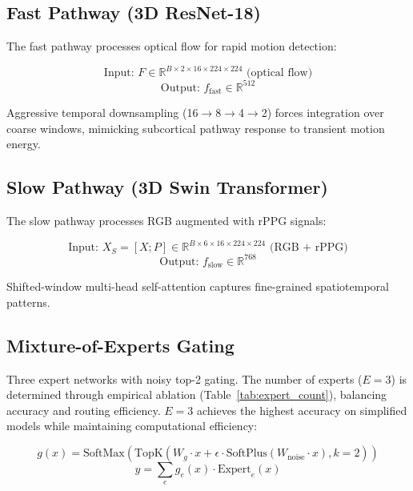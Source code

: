 \documentclass[preprint,12pt,authoryear]{elsarticle}
\begin{document}
\subsection{Fast Pathway (3D ResNet-18)}

The fast pathway processes optical flow for rapid motion detection:

\begin{equation}
\text{Input: } F \in \mathbb{R}^{B \times 2 \times 16 \times 224 \times 224} \text{ (optical flow)}
\end{equation}
\begin{equation}
\text{Output: } f_{\text{fast}} \in \mathbb{R}^{512}
\end{equation}

Aggressive temporal downsampling (16$\rightarrow$8$\rightarrow$4$\rightarrow$2) forces integration over coarse windows, mimicking subcortical pathway response to transient motion energy.

\subsection{Slow Pathway (3D Swin Transformer)}

The slow pathway processes RGB augmented with rPPG signals:

\begin{equation}
\text{Input: } X_S = [X; P] \in \mathbb{R}^{B \times 6 \times 16 \times 224 \times 224} \text{ (RGB + rPPG)}
\end{equation}
\begin{equation}
\text{Output: } f_{\text{slow}} \in \mathbb{R}^{768}
\end{equation}

Shifted-window multi-head self-attention captures fine-grained spatiotemporal patterns.

\subsection{Mixture-of-Experts Gating}

Three expert networks with noisy top-2 gating. The number of experts ($E=3$) is determined through empirical ablation (Table~\ref{tab:expert_count}), balancing accuracy and routing efficiency. $E=3$ achieves the highest accuracy on simplified models while maintaining computational efficiency:

\begin{equation}
g(x) = \text{SoftMax}(\text{TopK}(W_g \cdot x + \epsilon \cdot \text{SoftPlus}(W_{\text{noise}} \cdot x), k=2))
\end{equation}
\begin{equation}
y = \sum_e g_e(x) \cdot \text{Expert}_e(x)
\end{equation}
\end{document}
